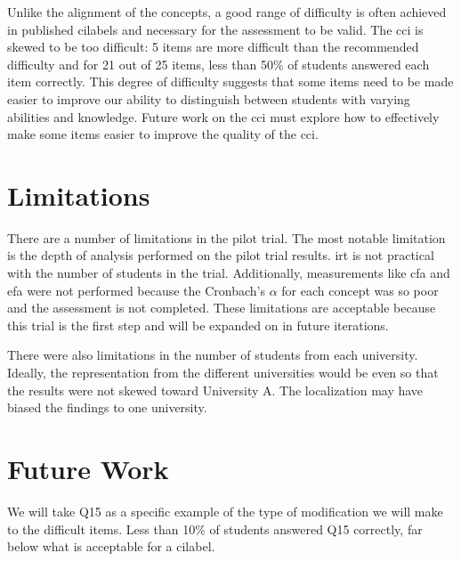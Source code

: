 
Unlike the alignment of the concepts, a good range of difficulty is often achieved in published \glspl{cilabel} and necessary for the assessment to be valid. The \gls{cci} is skewed to be too difficult: 5 items are more difficult than the recommended difficulty and for 21 out of 25 items, less than 50\% of students answered each item correctly. This degree of difficulty suggests that some items need to be made easier to improve our ability to distinguish between students with varying abilities and knowledge. Future work on the \gls{cci} must explore how to effectively make some items easier to improve the quality of the \gls{cci}. 


\section{Limitations}

There are a number of limitations in the pilot trial. The most notable limitation is the depth of analysis performed on the pilot trial results. \gls{irt} is not practical with the number of students in the trial. Additionally, measurements like \gls{cfa} and \gls{efa} were not performed because the Cronbach's $\alpha$ for each concept was so poor and the assessment is not completed. These limitations are acceptable because this trial is the first step and will be expanded on in future iterations.

There were also limitations in the number of students from each university. Ideally, the representation from the different universities would be even so that the results were not skewed toward University A. The localization may have biased the findings to one university.

\section{Future Work}

We will take Q15 as a specific example of the type of modification we will make to the difficult items. Less than 10\% of students answered Q15 correctly, far below what is acceptable for a \gls{cilabel}. 


